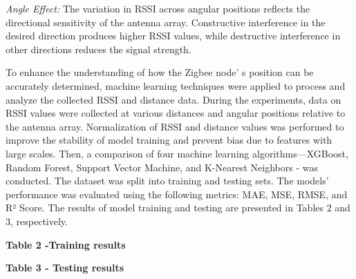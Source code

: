 \emph{Angle Effect:} The variation in RSSI across angular positions
reflects the directional sensitivity of the antenna array. Constructive
interference in the desired direction produces higher RSSI values, while
destructive interference in other directions reduces the signal
strength.

To enhance the understanding of how the Zigbee node' s
position can be accurately determined, machine learning techniques were
applied to process and analyze the collected RSSI and distance data.
During the experiments, data on RSSI values were collected at various
distances and angular positions relative to the antenna array.
Normalization of RSSI and distance values was performed to improve the
stability of model training and prevent bias due to features with large
scales. Then, a comparison of four machine learning
algorithms---XGBoost, Random Forest, Support Vector Machine, and
K-Nearest Neighbors - was conducted. The dataset was split into training
and testing sets. The models'{} performance was evaluated
using the following metrics: MAE, MSE, RMSE, and R² Score. The results
of model training and testing are presented in Tables 2 and 3,
respectively.

{\bfseries Table 2 -Training results}


{\bfseries Table 3 - Testing results}

